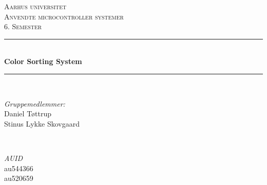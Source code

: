 \documentclass[12pt]{article}
\begin{document}
	
	\begin{titlepage}
		
		
		
		\newcommand{\HRule}{\rule{\linewidth}{0.5mm}} %
		\setlength{\topmargin}{0in}
		\centering %
		
		\textsc{\LARGE Aarhus universitet}\\[1.5cm] %
		\textsc{\Large Anvendte microcontroller systemer}\\[0.5cm] %
		\textsc{\large 6. Semester}\\[0.5cm] %
		
		
		\HRule \\[0.4cm]
		{ \huge \bfseries Color Sorting System}\\ %
		\HRule \\[1cm]
		
		
		\begin{minipage}{0.4\textwidth}
			\begin{flushleft} \large
				\emph{Gruppemedlemmer:}\\
				Daniel Tøttrup \\
				Stinus Lykke Skovgaard \\
			\end{flushleft}
		\end{minipage}
		~
		\begin{minipage}{0.4\textwidth}
			\begin{flushright} \large
				\emph{AUID} \\
				au544366\\
				au520659\
			\end{flushright}
		\end{minipage}\\[5cm]
		

\end{titlepage}
\end{document}
